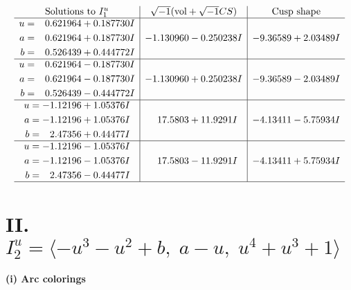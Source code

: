 \documentclass[1p]{elsarticle_modified}
\theoremstyle{definition}
\newcommand{\I}{\sqrt{-1}}
\begin{document}
$$\begin{array}{c|c|c}  
\text{Solutions to }I^u_{1}& \I (\text{vol} + \sqrt{-1}CS) & \text{Cusp shape}\\
 \hline 
\begin{aligned}
u &= \phantom{-}0.621964 + 0.187730 I \\
a &= \phantom{-}0.621964 + 0.187730 I \\
b &= \phantom{-}0.526439 + 0.444772 I\end{aligned}
 & -1.130960 - 0.250238 I & -9.36589 + 2.03489 I \\ \hline\begin{aligned}
u &= \phantom{-}0.621964 - 0.187730 I \\
a &= \phantom{-}0.621964 - 0.187730 I \\
b &= \phantom{-}0.526439 - 0.444772 I\end{aligned}
 & -1.130960 + 0.250238 I & -9.36589 - 2.03489 I \\ \hline\begin{aligned}
u &= -1.12196 + 1.05376 I \\
a &= -1.12196 + 1.05376 I \\
b &= \phantom{-}2.47356 + 0.44477 I\end{aligned}
 & \phantom{-}17.5803 + 11.9291 I & -4.13411 - 5.75934 I \\ \hline\begin{aligned}
u &= -1.12196 - 1.05376 I \\
a &= -1.12196 - 1.05376 I \\
b &= \phantom{-}2.47356 - 0.44477 I\end{aligned}
 & \phantom{-}17.5803 - 11.9291 I & -4.13411 + 5.75934 I\\
 \hline 
 \end{array}$$\newpage\newpage\renewcommand{\arraystretch}{1}
\centering \section*{II. $I^u_{2}= \langle - u^3- u^2+b,\;a- u,\;u^4+u^3+1 \rangle$}
\flushleft \textbf{(i) Arc colorings}\\
\end{document}
